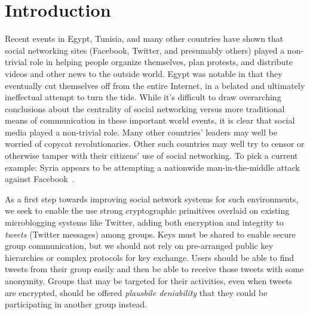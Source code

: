 \section{Introduction}

Recent events in Egypt, Tunisia, and many other countries have shown that social networking sites (Facebook, Twitter, and presumably others) played a non-trivial role in helping people organize themselves, plan protests, and distribute videos and other news to the outside world. Egypt was notable in that they eventually cut themselves off from the entire Internet, in a belated and ultimately ineffectual attempt to turn the tide. While it's difficult to draw overarching conclusions about the centrality of social networking versus more traditional means of communication in these important world events, it is clear that social media played a non-trivial role. Many other countries' leaders may well be worried of copycat revolutionaries. Other such countries may well try to censor or otherwise tamper with their citizens' use of social networking. To pick a current example: Syria appears to be attempting
a nationwide man-in-the-middle attack against Facebook~\cite{syria-facebook}. 

As a first step towards improving social network systems for such
environments, we seek to enable the use strong cryptographic primitives
overlaid on existing microblogging systems like Twitter, adding both
encryption and integrity to {\em tweets} (Twitter messages) among
groups. Keys must be shared to enable secure group communication, but we
should not rely on pre-arranged public key hierarchies or complex
protocols for key exchange. Users should be able to find tweets from
their group easily and then be able to receive those tweets with some
anonymity. Groups that may be targeted for their activities, even when
tweets are encrypted, should be offered {\em plausbile deniability} that
they could be participating in another group instead.


